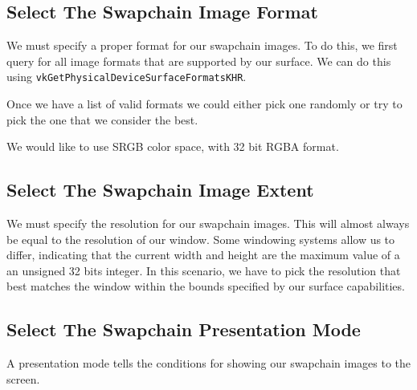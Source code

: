 \subsection{Select The Swapchain Image Format}

We must specify a proper format for our swapchain images.
To do this, we first query for all image formats that are supported by our
surface.
We can do this using \texttt{vkGetPhysicalDeviceSurfaceFormatsKHR}.

Once we have a list of valid formats we could either pick one randomly or
try to pick the one that we consider the best.

\begin{minipage}{\linewidth}{\noindent}
    
\end{minipage}

We would like to use SRGB color space, with 32 bit RGBA format.

\subsection{Select The Swapchain Image Extent}

We must specify the resolution for our swapchain images.
This will almost always be equal to the resolution of our window.
Some windowing systems allow us to differ, indicating that the current
width and height are the maximum value of a an unsigned 32 bits integer.
In this scenario, we have to pick the resolution that best matches the window
within the bounds specified by our surface capabilities.

\begin{minipage}{\linewidth}{\noindent}
    
\end{minipage}

\subsection{Select The Swapchain Presentation Mode}

A presentation mode tells the conditions for showing our swapchain images to
the screen.


